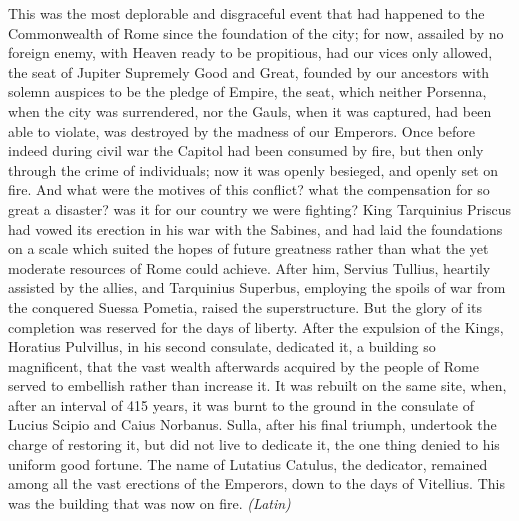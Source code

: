This was the most deplorable and disgraceful event that had happened to the Commonwealth of Rome since the foundation of the city; for now, assailed by no foreign enemy, with Heaven ready to be propitious, had our vices only allowed, the seat of Jupiter Supremely Good and Great, founded by our ancestors with solemn auspices to be the pledge of Empire, the seat, which neither Porsenna, when the city was surrendered, nor the Gauls, when it was captured, had been able to violate, was destroyed by the madness of our Emperors. Once before indeed during civil war the Capitol had been consumed by fire, but then only through the crime of individuals; now it was openly besieged, and openly set on fire. And what were the motives of this conflict? what the compensation for so great a disaster? was it for our country we were fighting? King Tarquinius Priscus had vowed its erection in his war with the Sabines, and had laid the foundations on a scale which suited the hopes of future greatness rather than what the yet moderate resources of Rome could achieve. After him, Servius Tullius, heartily assisted by the allies, and Tarquinius Superbus, employing the spoils of war from the conquered Suessa Pometia, raised the superstructure. But the glory of its completion was reserved for the days of liberty. After the expulsion of the Kings, Horatius Pulvillus, in his second consulate, dedicated it, a building so magnificent, that the vast wealth afterwards acquired by the people of Rome served to embellish rather than increase it. It was rebuilt on the same site, when, after an interval of 415 years, it was burnt to the ground in the consulate of Lucius Scipio and Caius Norbanus. Sulla, after his final triumph, undertook the charge of restoring it, but did not live to dedicate it, the one thing denied to his uniform good fortune. The name of Lutatius Catulus, the dedicator, remained among all the vast erections of the Emperors, down to the days of Vitellius. This was the building that was now on fire. \emph{(Latin)}



